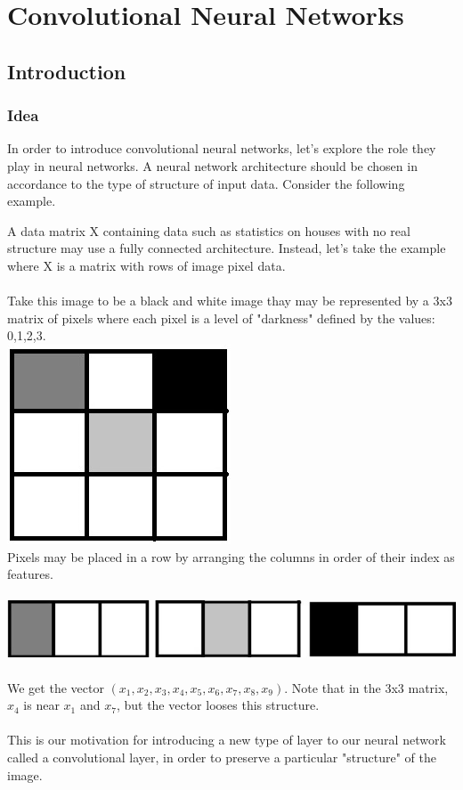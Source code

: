 
\chapter{Convolutional Neural Networks}

\section{Introduction}

\subsection{Idea} In order to introduce convolutional neural networks, let's explore the role they play in neural networks.
A neural network architecture should be chosen in accordance to the type of structure of input data. Consider the following example.

\begin{example}
A data matrix X containing data such as statistics on houses with no real structure may use a fully connected architecture. Instead, let's take the example where X is a matrix with rows  of image pixel data. \\\\ Take this image to be a black and white image thay may be represented by a 3x3 matrix of pixels where each pixel is a level of "darkness" defined by the values: 0,1,2,3.\\

\includegraphics[scale=0.40]{images/Chapter 11/pic1.png}
\quad
\\
Pixels may be placed in a row by arranging the columns in order of their index as features.\\\\
\includegraphics[scale=0.40]{images/Chapter 11/pic2.png}
\\\\
We get the vector $(x_1,x_2,x_3,x_4,x_5,x_6,x_7,x_8,x_9)$.
Note that in the 3x3 matrix, $x_4$ is near $x_1$ and $x_7$, but the vector looses this structure. \\\\
This is our motivation for introducing a new type of layer to our neural network called a convolutional layer, in order to preserve a particular "structure" of the image. 

\end{example}


